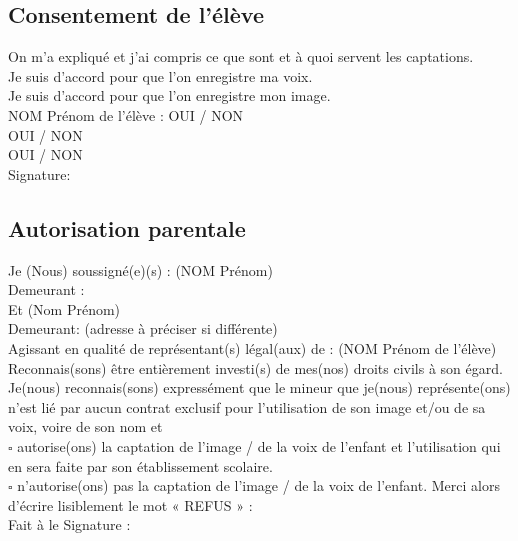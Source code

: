 \documentclass[10pt, a4paper,article]{nsi}
\begin{document}
\subsection*{Consentement de l'élève}

\dleft{14cm}
{On m'a expliqué et j'ai compris ce que sont et à quoi servent les captations.\\
Je suis d'accord pour que l'on enregistre ma voix.\\
Je suis d'accord pour que l'on enregistre mon image.\\
NOM Prénom de l'élève :}
{
OUI / NON\\
OUI / NON\\
OUI / NON\\
Signature:
}

\subsection*{Autorisation parentale}
Je (Nous) soussigné(e)(s) : {\scriptsize(NOM Prénom)}\dotfill  \\
Demeurant : \dotfill\\
Et  {\scriptsize(Nom Prénom)}\dotfill\\
Demeurant: {\scriptsize(adresse à préciser si différente)}\dotfill\\
Agissant en qualité de représentant(s) légal(aux) de : {\scriptsize(NOM Prénom de l'élève)}\dotfill\\

Reconnais(sons) être entièrement investi(s) de mes(nos) droits civils à son égard. Je(nous) reconnais(sons) expressément que le mineur que je(nous) représente(ons) n'est lié par aucun contrat exclusif pour l'utilisation de son image et/ou de sa voix, voire de son nom et\\

$\square$  autorise(ons) la captation de l'image / de la voix de l'enfant et l'utilisation qui en sera faite par son établissement scolaire.\\
    
$\square$ n'autorise(ons) pas la captation de l'image / de la voix de l'enfant. Merci alors d'écrire lisiblement le mot « REFUS » : \\


Fait à \hspace*{5cm} le \hspace*{7.5cm} Signature : 
\end{document}
